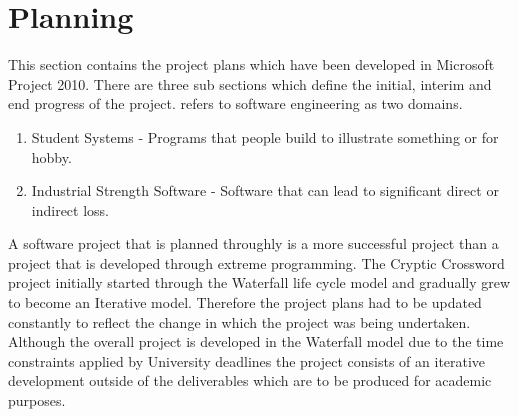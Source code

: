 \section{Planning}
\label{sec:planning}

This section contains the project plans which have been developed in Microsoft
Project 2010. There are three sub sections which define the initial, interim and end progress of the project. \citet{planning05} refers to software engineering as two domains.

\begin{enumerate}
\item Student Systems - Programs that people build to illustrate something or for hobby.
\item Industrial Strength Software - Software that can lead to significant direct or indirect loss.
\end{enumerate}

A software project that is planned throughly is a more successful project than a project that is developed through extreme programming. The Cryptic Crossword project initially started through the Waterfall life cycle model and gradually grew to become an Iterative model. Therefore the project plans had to be updated constantly to reflect the change in which the project was being undertaken. Although the overall project is developed in the Waterfall model due to the time constraints applied by University deadlines the project consists of an iterative development outside of the deliverables which are to be produced for academic purposes. 

